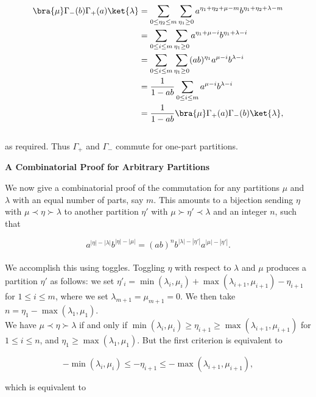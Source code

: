 \begin{align*}
	\bra{\mu} \Gamma_-(b) \Gamma_+(a) \ket{\lambda} &= \sum_{0 \leq \eta_2 \leq m} \sum_{\eta_1 \geq 0} a^{\eta_1 + \eta_2 + \mu - m} b^{\eta_1 + \eta_2 + \lambda - m}\\
	&= \sum_{0 \leq i \leq m} \sum_{\eta_1 \geq 0} a^{\eta_1 + \mu - i} b^{\eta_1 + \lambda - i}\\
	&= \sum_{0 \leq i \leq m} \sum_{\eta_1 \geq 0} (ab)^{\eta_1} a^{\mu - i} b^{\lambda - i}\\
	&= \frac{1}{1 - ab} \sum_{0 \leq i \leq m} a^{\mu - i} b^{\lambda - i}\\
	&= \frac{1}{1 - ab} \bra{\mu} \Gamma_+(a) \Gamma_-(b) \ket{\lambda},
\end{align*}
~\\
as required. Thus $\Gamma_+$ and $\Gamma_-$ commute for one-part partitions.

\vspace{.5in}

\Large \textbf{A Combinatorial Proof for Arbitrary Partitions}\\

\normalsize

We now give a combinatorial proof of the commutation for any partitions $\mu$ and $\lambda$ with an equal number of parts, say $m$. This amounts to a bijection sending $\eta$ with $\mu \prec \eta \succ \lambda$ to another partition $\eta'$ with $\mu \succ \eta' \prec \lambda$ and an integer $n$, such that

$$
	a^{|\eta| - |\lambda|} b^{|\eta| - |\mu|} = (ab)^n b^{|\lambda| - |\eta'|} a^{|\mu| - |\eta'|}.
$$
~\\
We accomplish this using toggles. Toggling $\eta$ with respect to $\lambda$ and $\mu$ produces a partition $\eta'$ as follows: we set $\eta'_i = \min(\lambda_i, \mu_i) + \max(\lambda_{i + 1}, \mu_{i + 1}) - \eta_{i + 1}$ for $1 \leq i \leq m$, where we set $\lambda_{m + 1} = \mu_{m + 1} = 0$. We then take $n = \eta_1 - \max(\lambda_1, \mu_1)$.\\

We have $\mu \prec \eta \succ \lambda$ if and only if $\min(\lambda_i, \mu_i) \geq \eta_{i + 1} \geq \max(\lambda_{i + 1}, \mu_{i + 1})$ for $1 \leq i \leq n$, and $\eta_1 \geq \max(\lambda_1, \mu_1)$. But the first criterion is equivalent to

$$
	-\min(\lambda_i, \mu_i) \leq -\eta_{i + 1} \leq -\max(\lambda_{i + 1}, \mu_{i + 1}),
$$

which is equivalent to

